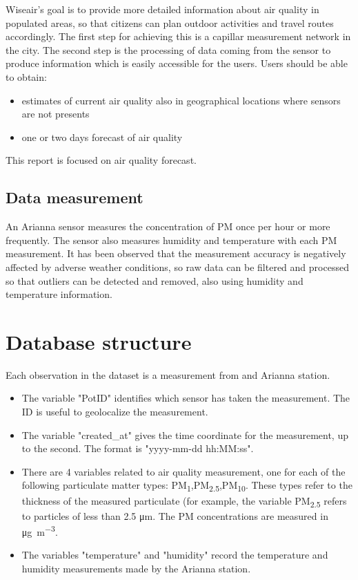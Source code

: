 \documentclass{article}
\begin{document}
Wiseair's goal is to provide more detailed information about air quality in populated areas, so that citizens can plan outdoor activities and travel routes 
accordingly. The first step for achieving this is a capillar measurement network in the city. The second step is the processing of data coming from the sensor
to produce information which is easily accessible for the users. Users should be able to obtain:

\begin{itemize}
 \item estimates of current air quality also in geographical locations where sensors are not presents 
 \item one or two days forecast of air quality 

\end{itemize}

This report is focused on air quality forecast.



\subsection{Data measurement}

An Arianna sensor measures the concentration of PM once per hour or more frequently. The sensor also measures humidity and 
temperature with each PM measurement. It has been observed that the measurement accuracy is negatively affected by adverse weather
 conditions, so raw data can be filtered and processed so that outliers can be detected and removed, also using humidity and temperature information.

\section{Database structure}

Each observation in the dataset is a measurement from and Arianna station. 
\begin{itemize}
    \item  The variable "PotID" identifies which sensor has taken the measurement. The ID is useful to geolocalize the measurement.
    \item The variable "created\_at" gives the time coordinate for the measurement, up to the second. The format is "yyyy-mm-dd hh:MM:ss".
    \item There are 4 variables related to air quality measurement, one for each of the following particulate matter types:
    PM\textsubscript{1},PM\textsubscript{2.5},PM\textsubscript{10}. These types refer to the thickness of the measured
    particulate (for example, the variable PM\textsubscript{2.5} refers to particles of less than 2.5 \si{\micro\meter}. The
    PM concentrations are measured in \si{\micro\gram\per\cubic\meter}.
    \item The variables "temperature" and "humidity" record the temperature and humidity measurements made by the Arianna station.
\end{itemize}
\end{document}
